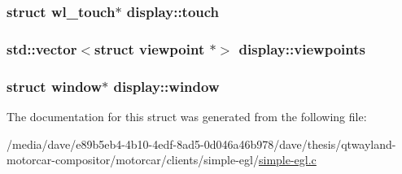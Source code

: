 \hypertarget{structdisplay_a8adde40dc3f12d1a6967cf424e2284df}{
\subsubsection[{touch}]{\setlength{\rightskip}{0pt plus 5cm}struct wl\-\_\-touch$\ast$ display\-::touch}}\label{structdisplay_a8adde40dc3f12d1a6967cf424e2284df}
\hypertarget{structdisplay_ab06917115c7908ddb72c42162d234b72}{
\subsubsection[{viewpoints}]{\setlength{\rightskip}{0pt plus 5cm}std\-::vector$<$struct {\bf viewpoint} $\ast$$>$ display\-::viewpoints}}\label{structdisplay_ab06917115c7908ddb72c42162d234b72}
\hypertarget{structdisplay_a9974d560bec291487ae2440f897ffc58}{
\subsubsection[{window}]{\setlength{\rightskip}{0pt plus 5cm}struct {\bf window}$\ast$ display\-::window}}\label{structdisplay_a9974d560bec291487ae2440f897ffc58}


The documentation for this struct was generated from the following file\-:\begin{DoxyCompactItemize}
\item 
/media/dave/e89b5eb4-\/4b10-\/4edf-\/8ad5-\/0d046a46b978/dave/thesis/qtwayland-\/motorcar-\/compositor/motorcar/clients/simple-\/egl/\hyperlink{simple-egl_8c}{simple-\/egl.\-c}\end{DoxyCompactItemize}
